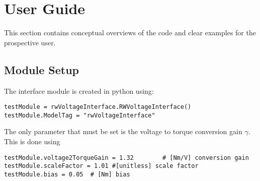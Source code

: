 \section{User Guide}
This section contains conceptual overviews of the code and clear examples for the prospective user. 

\subsection{Module Setup}
The interface module is created in python using:
\begin{verbatim}
testModule = rwVoltageInterface.RWVoltageInterface()
testModule.ModelTag = "rwVoltageInterface"
\end{verbatim}
The only parameter that must be set is the voltage to torque conversion gain $\gamma$.  This is done using
\begin{verbatim}
testModule.voltage2TorqueGain = 1.32        # [Nm/V] conversion gain 
testModule.scaleFactor = 1.01 #[unitless] scale factor
testModule.bias = 0.05	# [Nm] bias
\end{verbatim}